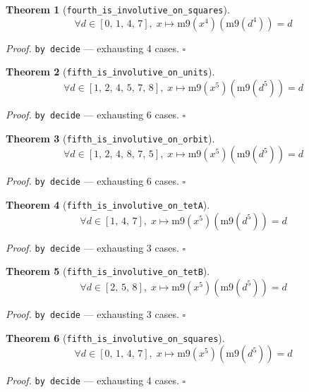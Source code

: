 \documentclass[11pt]{article}
\newtheorem{theorem}{Theorem}[section]
\begin{document}
\begin{theorem}[\texttt{fourth\_is\_involutive\_on\_squares}]
\[ \forall d \in [0,\,1,\,4,\,7],\; x \mapsto \mathrm{m9}\mathopen{}\left(x^{4}\right)\mathopen{}\left(\mathrm{m9}\mathopen{}\left(d^{4}\right)\right) = d \]
\end{theorem}
\noindent\emph{Proof.} \texttt{by decide} --- exhausting 4 cases. \hfill$\square$

\begin{theorem}[\texttt{fifth\_is\_involutive\_on\_units}]
\[ \forall d \in [1,\,2,\,4,\,5,\,7,\,8],\; x \mapsto \mathrm{m9}\mathopen{}\left(x^{5}\right)\mathopen{}\left(\mathrm{m9}\mathopen{}\left(d^{5}\right)\right) = d \]
\end{theorem}
\noindent\emph{Proof.} \texttt{by decide} --- exhausting 6 cases. \hfill$\square$

\begin{theorem}[\texttt{fifth\_is\_involutive\_on\_orbit}]
\[ \forall d \in [1,\,2,\,4,\,8,\,7,\,5],\; x \mapsto \mathrm{m9}\mathopen{}\left(x^{5}\right)\mathopen{}\left(\mathrm{m9}\mathopen{}\left(d^{5}\right)\right) = d \]
\end{theorem}
\noindent\emph{Proof.} \texttt{by decide} --- exhausting 6 cases. \hfill$\square$

\begin{theorem}[\texttt{fifth\_is\_involutive\_on\_tetA}]
\[ \forall d \in [1,\,4,\,7],\; x \mapsto \mathrm{m9}\mathopen{}\left(x^{5}\right)\mathopen{}\left(\mathrm{m9}\mathopen{}\left(d^{5}\right)\right) = d \]
\end{theorem}
\noindent\emph{Proof.} \texttt{by decide} --- exhausting 3 cases. \hfill$\square$

\begin{theorem}[\texttt{fifth\_is\_involutive\_on\_tetB}]
\[ \forall d \in [2,\,5,\,8],\; x \mapsto \mathrm{m9}\mathopen{}\left(x^{5}\right)\mathopen{}\left(\mathrm{m9}\mathopen{}\left(d^{5}\right)\right) = d \]
\end{theorem}
\noindent\emph{Proof.} \texttt{by decide} --- exhausting 3 cases. \hfill$\square$

\begin{theorem}[\texttt{fifth\_is\_involutive\_on\_squares}]
\[ \forall d \in [0,\,1,\,4,\,7],\; x \mapsto \mathrm{m9}\mathopen{}\left(x^{5}\right)\mathopen{}\left(\mathrm{m9}\mathopen{}\left(d^{5}\right)\right) = d \]
\end{theorem}
\noindent\emph{Proof.} \texttt{by decide} --- exhausting 4 cases. \hfill$\square$
\end{document}
